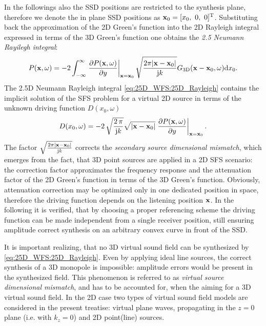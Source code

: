 In the followings also the SSD positions are restricted to the synthesis plane, therefore we denote the in plane SSD positions as $\mathbf{x}_0 = [x_0,\ 0,\ 0]^{\mathrm{T}}$.
Substituting back the approximation of the 2D Green's function into the 2D Rayleigh integral expressed in terms of the 3D Green's function one obtains the \emph{2.5 Neumann Rayilegh integral}:
\begin{equation}
P(\mathbf{x},\omega) = -2\int_{-\infty}^{\infty} \left. \frac{\partial P(\mathbf{x},\omega)}{\partial y} \right|_{\mathbf{x} = \mathbf{x}_0}\sqrt{\frac{2\pi |\mathbf{x}-\mathbf{x}_0|}{\mathrm{j} k}} G_{3\mathrm{D}}(\mathbf{x}-\mathbf{x}_0,\omega) \mathrm{d} x_0.
\label{eq:25D_WFS:25D_Rayleigh} 
\end{equation}
The 2.5D Neumann Rayleigh integral \eqref{eq:25D_WFS:25D_Rayleigh}  contains the implicit solution of the SFS problem for a virtual 2D source in terms of the unknown driving function $D(x_0, \omega)$
\begin{equation}
D(x_0,\omega) = 
- 2\,\sqrt{\frac{2\,\pi}{\mathrm{j} k}} \sqrt{|\mathbf{x}-\mathbf{x}_0|} \left. \frac{\partial P(\mathbf{x},\omega)}{\partial y} \right|_{\mathbf{x}=\mathbf{x}_0}.
\label{Eq:2_5D_driv_fun_implicit}
\end{equation}
The factor $\sqrt{\frac{2\pi |\mathbf{x}-\mathbf{x}_0|}{\mathrm{j} k}}$ corrects the \emph{secondary source dimensional mismatch}, which emerges from the fact, that 3D point sources are applied in a 2D SFS scenario: the correction factor approximates the frequency response and the attenuation factor of the 2D Green's function in terms of the 3D Green's function. Obviously, attenuation correction may be optimized only in one dedicated position in space, therefore the driving function depends on the listening position $\mathbf{x}$. In the following it is verified, that by choosing a proper referencing scheme the driving function can be made independent from a single receiver position, still ensuring amplitude correct synthesis on an arbitrary convex curve in front of the SSD.

It is important realizing, that no 3D virtual sound field can be synthesized by \eqref{eq:25D_WFS:25D_Rayleigh}. Even by applying ideal line sources, the correct synthesis of a 3D monopole is impossible: amplitude errors would be present in the synthesized field. This phenomenon is referred to as \emph{virtual source dimensional mismatch}, and has to be accounted for, when the aiming for a 3D virtual sound field. In the 2D case two types of virtual sound field models are considered in the present treatise: virtual plane waves, propagating in the $z=0$ plane (i.e. with $k_z = 0$) and 2D point(line) sources.

